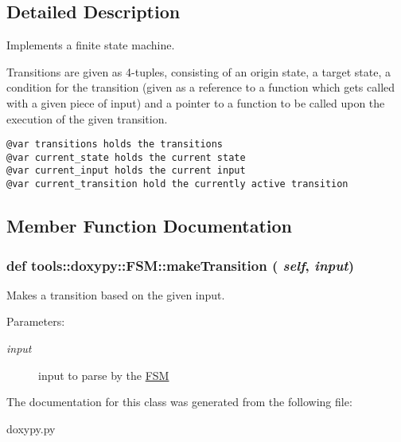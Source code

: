\subsection{Detailed Description}
Implements a finite state machine. 

Transitions are given as 4-tuples, consisting of an origin state, a target state, a condition for the transition (given as a reference to a function which gets called with a given piece of input) and a pointer to a function to be called upon the execution of the given transition.

\footnotesize\begin{verbatim}
@var transitions holds the transitions
@var current_state holds the current state
@var current_input holds the current input
@var current_transition hold the currently active transition
\end{verbatim}
\normalsize
 

\subsection{Member Function Documentation}
\hypertarget{classtools_1_1doxypy_1_1FSM_fd6f235b6e8f7bc9ad65574d3d626fd9}{
\subsubsection{\setlength{\rightskip}{0pt plus 5cm}def tools::doxypy::FSM::makeTransition ( {\em self}, \/   {\em input})}}
\label{classtools_1_1doxypy_1_1FSM_fd6f235b6e8f7bc9ad65574d3d626fd9}


Makes a transition based on the given input. 

\begin{Desc}
\item[Parameters:]
\begin{description}
\item[{\em input}]input to parse by the \hyperlink{classtools_1_1doxypy_1_1FSM}{FSM} \end{description}
\end{Desc}


The documentation for this class was generated from the following file:\begin{CompactItemize}
\item 
doxypy.py\end{CompactItemize}
